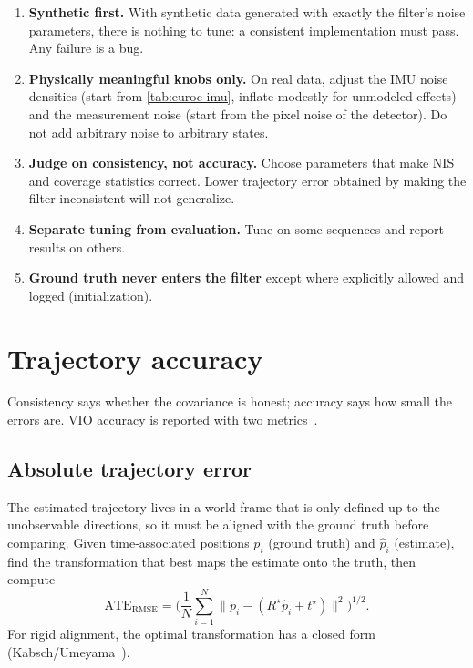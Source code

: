 \begin{enumerate}
  \item \textbf{Synthetic first.} With synthetic data generated with exactly the filter's noise parameters, there is
        nothing to tune: a consistent implementation must pass. Any failure is a bug.
  \item \textbf{Physically meaningful knobs only.} On real data, adjust the IMU noise densities (start from
        \cref{tab:euroc-imu}, inflate modestly for unmodeled effects) and the measurement noise (start from the pixel
        noise of the detector). Do not add arbitrary noise to arbitrary states.
  \item \textbf{Judge on consistency, not accuracy.} Choose parameters that make NIS and coverage statistics correct.
        Lower trajectory error obtained by making the filter inconsistent will not generalize.
  \item \textbf{Separate tuning from evaluation.} Tune on some sequences and report results on others.
  \item \textbf{Ground truth never enters the filter} except where explicitly allowed and logged (initialization).
\end{enumerate}

\section{Trajectory accuracy}

Consistency says whether the covariance is honest; accuracy says how small the errors are. VIO accuracy is
reported with two metrics~\cite{sturm2012tum, zhang2018tutorial}.

\subsection{Absolute trajectory error}

The estimated trajectory lives in a world frame that is only defined up to the unobservable directions, so it must
be aligned with the ground truth before comparing. Given time-associated positions $p_i$ (ground truth) and
$\hat p_i$ (estimate), find the transformation that best maps the estimate onto the truth, then compute
\begin{equation}
  \mathrm{ATE}_{\mathrm{RMSE}} = \Big(\frac1N\sum_{i=1}^N\big\|p_i - (R^\star\hat p_i + t^\star)\big\|^2\Big)^{1/2}.
\end{equation}
For rigid alignment, the optimal transformation has a closed form (Kabsch/Umeyama~\cite{umeyama1991}).

